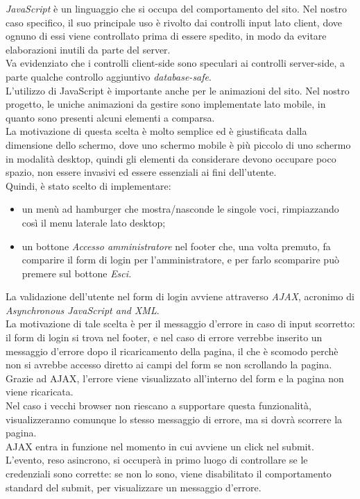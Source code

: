 ﻿\emph{JavaScript} è un linguaggio che si occupa del comportamento del sito. Nel nostro caso specifico, il suo principale uso è rivolto dai controlli 
input lato client, dove ognuno di essi viene controllato prima di essere spedito, in modo da evitare elaborazioni inutili da parte del server.\\
Va evidenziato che i controlli client-side sono speculari ai controlli server-side, a parte qualche controllo aggiuntivo \emph{database-safe}.\\
L'utilizzo di JavaScript è importante anche per le animazioni del sito. Nel nostro progetto, le uniche animazioni da gestire sono implementate 
lato mobile, in quanto sono presenti alcuni elementi a comparsa.\\
La motivazione di questa scelta è molto semplice ed è giustificata dalla dimensione dello schermo, dove uno schermo mobile è più piccolo di uno schermo
in modalità desktop, quindi gli elementi da considerare devono occupare poco spazio, non essere invasivi ed essere essenziali ai fini dell'utente. \\
Quindi, è stato scelto di implementare:
\begin{itemize}
    \item un menù ad hamburger che mostra/nasconde le singole voci, rimpiazzando così il menu laterale lato desktop;
    \item un bottone \emph{Accesso amministratore} nel footer che, una volta premuto, fa comparire il form di login per l'amministratore, e per farlo
    scomparire può premere sul bottone \emph{Esci.} 
\end{itemize}    

La validazione dell'utente nel form di login avviene attraverso \emph{AJAX}, acronimo di \emph{Asynchronous JavaScript and XML}.\\ 
La motivazione di tale scelta è per il messaggio d'errore in caso di input scorretto: il form di login si trova nel footer, e nel caso di errore 
verrebbe inserito un messaggio d'errore dopo il ricaricamento della pagina, il che è scomodo perchè non si avrebbe accesso diretto ai campi del form
se non scrollando la pagina.\\
Grazie ad AJAX, l'errore viene visualizzato all'interno del form e la pagina non viene ricaricata.\\
Nel caso i vecchi browser non riescano a supportare questa funzionalità, visualizzeranno comunque lo stesso messaggio di errore, ma si dovrà scorrere la pagina.\\
AJAX entra in funzione nel momento in cui avviene un click nel submit. L'evento, reso asincrono, si occuperà in primo luogo di controllare 
se le credenziali sono corrette: se non lo sono, viene disabilitato il comportamento standard del submit, per visualizzare 
un messaggio d'errore.\\